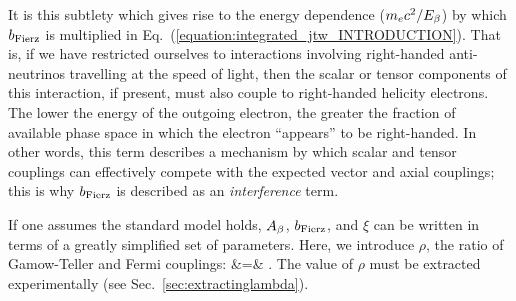 It is this subtlety which gives rise to the energy dependence ($m_e c^2 / E_{\beta} $) by which $b_{\mathrm{Fierz}}$ is multiplied in Eq.~(\ref{equation:integrated_jtw_INTRODUCTION}).  
That is, if we have restricted ourselves to interactions involving right-handed anti-neutrinos travelling at the speed of light, then the scalar or tensor components of this interaction, if present, must also couple to right-handed helicity electrons.  The lower the energy of the outgoing electron, the greater the fraction of available phase space in which the electron ``appears'' to be right-handed.  In other words, this term describes a mechanism by which scalar and tensor couplings can effectively compete with the expected vector and axial couplings;  this is why $b_{\mathrm{Fierz}}$ is described as an \emph{interference} term.



If one assumes the standard model holds, $A_{\beta}$, $b_{\mathrm{Fierz}}$, and $\xi$ can be written in terms of a greatly simplified set of parameters.  Here, we introduce $\rho$, the ratio of Gamow-Teller and Fermi couplings: 
\bea
\rho &=& .%
\label{eq:definerho_intro}
\eea
The value of $\rho$ must be extracted experimentally (see Sec.~\ref{sec:extractinglambda}).
~



